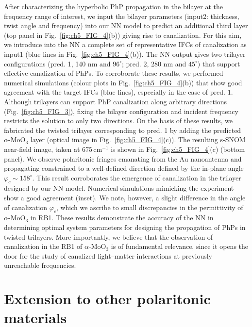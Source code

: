 After characterizing the hyperbolic PhP propagation in the bilayer at the frequency range of interest, we input the bilayer parameters (input2: thickness, twist angle and frequency) into our NN model to predict an additional third layer (top panel in Fig.~\ref{fig:ch5_FIG_4}(b)) giving rise to canalization. For this aim, we introduce into the NN a complete set of representative IFCs of canalization as input1 (blue lines in Fig.~\ref{fig:ch5_FIG_4}(b)). The NN output gives two trilayer configurations (pred. 1, 140 nm and $96^\circ$; pred. 2, 280 nm and $45^\circ$) that support effective canalization of PhPs. To corroborate these results, we performed numerical simulations (colour plots in Fig.~\ref{fig:ch5_FIG_4}(b)) that show good agreement with the target IFCs (blue lines), especially in the case of pred. 1. Although trilayers can support PhP canalization along arbitrary directions (Fig.~\ref{fig:ch5_FIG_3}), fixing the bilayer configuration and incident frequency restricts the solution to only two directions. On the basis of these results, we fabricated the twisted trilayer corresponding to pred. 1 by adding the predicted $\alpha\text{-}\mathrm{MoO}_3$ layer (optical image in Fig.~\ref{fig:ch5_FIG_4}(c)). The resulting s-SNOM near-field image, taken at $675\,\mathrm{cm}^{-1}$ is shown in Fig.~\ref{fig:ch5_FIG_4}(c) (bottom panel). We observe polaritonic fringes emanating from the Au nanoantenna and propagating constrained to a well-defined direction defined by the in-plane angle $\varphi_c\sim158^\circ$. This result corroborates the emergence of canalization in the trilayer designed by our NN model. Numerical simulations mimicking the experiment show a good agreement (inset). We note, however, a slight difference in the angle of canalization $\varphi_c$, which we ascribe to small discrepancies in the permittivity of $\alpha\text{-}\mathrm{MoO}_3$ in RB1. These results demonstrate the accuracy of the NN in determining optimal system parameters for designing the propagation of PhPs in twisted trilayers. More importantly, we believe that the observation of canalization in the RB1 of $\alpha\text{-}\mathrm{MoO}_3$ is of fundamental relevance, since it opens the door for the study of canalized light--matter interactions at previously unreachable frequencies.


\section{Extension to other polaritonic materials}\label{sec:ch5_materials}

